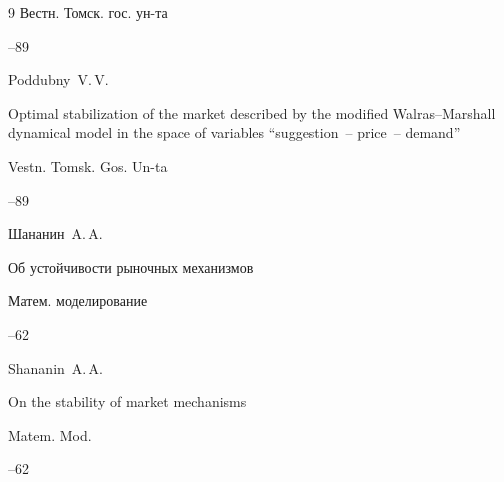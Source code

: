 \begin{thebibliography}{9}
\jour Вестн. Томск. гос.  ун-та



--89

\misctransl

\by Poddubny~V.\,V. 

\paper Optimal stabilization of the market described by the modified Walras--Marshall dynamical model in the space of variables ``suggestion~-- price~-- demand''

\jour Vestn. Tomsk. Gos. Un-ta



--89








\by Шананин~A.\,A. 

\paper Об устойчивости рыночных механизмов

\jour Матем. моделирование




--62

\misctransl

\by Shananin~A.\,A.

\paper On the stability of market mechanisms

\jour Matem. Mod.




--62







\end{thebibliography}







\noindent

\hskip6.5cm \thedate \par\noindent

\hskip6.5cm\therevdate\par






\makeengtitlem



\renewcommand{\baselinestretch}{.9}





\newpage



%

% 